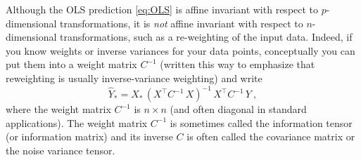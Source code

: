 \documentclass[12pt,letterpaper]{article}
\begin{document}
Although the OLS prediction \eqref{eq:OLS} is affine invariant with respect to $p$-dimensional transformations, it is \emph{not} affine invariant with respect to $n$-dimensional transformations, such as a re-weighting of the input data. Indeed, if you know weights or inverse variances for your data points, conceptually you can put them into a weight matrix $C^{-1}$ (written this way to emphasize that reweighting is usually inverse-variance weighting) and write
\begin{equation}\label{eq:wls}
    \hat{Y}_\ast = X_\ast\,(X^\top C^{-1}\,X)^{-1}\,X^\top C^{-1}\,Y
    ~,
\end{equation}
where the weight matrix $C^{-1}$ is $n\times n$ (and often diagonal in standard applications). The weight matrix $C^{-1}$ is sometimes called the information tensor (or information matrix) and its inverse $C$ is often called the covariance matrix or the noise variance tensor.
\end{document}
